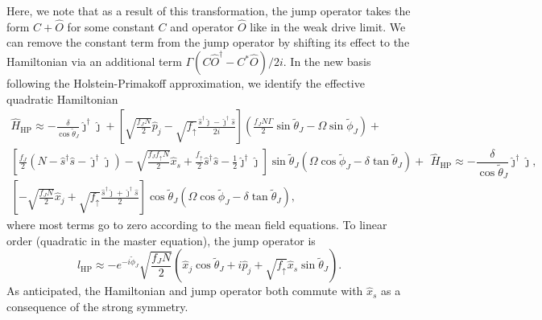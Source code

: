 \documentclass[11pt]{article}
\begin{document}
Here, we note that as a result of this transformation, the jump operator takes the form $C + \hat O$ for some constant $C$ and operator $\hat O$ like in the weak drive limit. We can remove the constant term from the jump operator by shifting its effect to the Hamiltonian via an additional term $\Gamma (C \hat{O}^\dagger - C^* \hat O)/2i$.
In the new basis following the Holstein-Primakoff approximation, we identify the effective quadratic Hamiltonian
\begin{subequations}
\begin{multline}
    \hat H_{\text{HP}} \approx -\frac{\delta}{\cos \tilde{\theta}_J} \hat \jmath^\dagger \hat \jmath + \left[\sqrt{\frac{f_J N}{2}} \hat p_j - \sqrt{f_{\uparrow}} \frac{\hat s^\dagger \hat \jmath - \hat \jmath^\dagger \hat s}{2i} \right] \left( \frac{f_J N \Gamma}{2} \sin \tilde{\theta}_J - \Omega \sin \tilde{\phi}_J \right) +\\
    \left[\frac{f_J }{2}(N-\hat{s}^\dagger \hat s - \hat{\jmath}^\dagger \hat \jmath) - \sqrt{\frac{f_J f_{\uparrow} N}{2}} \hat x_s  + \frac{f_{\uparrow}}{2} \hat s^\dagger \hat s -\frac{1}{2} \hat \jmath^\dagger \hat \jmath \right] \sin \tilde{\theta}_J  \left( \Omega \cos \tilde{\phi}_J - \delta \tan \tilde{\theta}_J \right) + \\
    \left[-\sqrt{\frac{ f_J N}{2}}  \hat x_j  + \sqrt{f_{\uparrow}} \frac{\hat s^\dagger \hat \jmath + \hat \jmath^\dagger \hat s}{2}\right] \cos \tilde{\theta}_J  \left( \Omega \cos \tilde{\phi}_J - \delta \tan \tilde{\theta}_J \right),
\end{multline}
\begin{equation}
    \hat H_{\text{HP}} \approx -\frac{\delta}{\cos \tilde{\theta}_J} \hat \jmath^\dagger \hat \jmath,
\end{equation}
\end{subequations}
where most terms go to zero according to the mean field equations.
To linear order (quadratic in the master equation), the jump operator is
\begin{equation}
    \hat l_{\text{HP}} \approx -e^{- i \tilde{\phi}_J} \sqrt{\frac{f_J N}{2}}\left(\hat x_j \cos \tilde{\theta}_J + i \hat p_j + \sqrt{f_{\uparrow}} \hat x_s \sin \tilde{\theta}_J \right).
\end{equation}
As anticipated, the Hamiltonian and jump operator both commute with $\hat x_s$ as a consequence of the strong symmetry.
\end{document}

